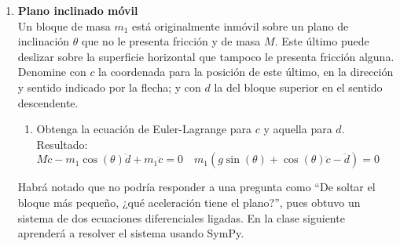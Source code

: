 \documentclass[11pt, a4paper, twoside]{article}
\begin{document}
\begin{enumerate}
\item
	\begin{minipage}[t][4.5cm]{0.7\textwidth}
		\textbf{Plano inclinado móvil}\\
		Un bloque de masa \(m_1\) está originalmente inmóvil sobre un plano de inclinación \(\theta\) que no le presenta fricción y de masa \(M\).
		Este último puede deslizar sobre la superficie horizontal que tampoco le presenta fricción alguna.
		Denomine con \(c\) la coordenada para la posición de este último, en la dirección y sentido indicado por la flecha; y con \(d\) la del bloque superior en el sentido descendente.
		\begin{enumerate}
			\item Obtenga la ecuación de Euler-Lagrange para \(c\) y aquella para \(d\).\\ 
			Resultado:
			\(
				M \ddot{c} - m_1 \cos{\left(\theta \right)} \ddot{d} + m_1 \ddot{c} = 0
				\quad
				m_1 \left(g \sin{\left(\theta \right)} + \cos{\left(\theta \right)} \ddot{c} - \ddot{d }\right) = 0
			\)
		\end{enumerate}
	\end{minipage}
	\begin{minipage}[c][0cm][t]{0.3\textwidth}
		
	\end{minipage}
	Habrá notado que no podría responder a una pregunta como ``De soltar el bloque más pequeño, ¿qué aceleración tiene el plano?'', pues obtuvo un sistema de dos ecuaciones diferenciales ligadas.
	En la clase siguiente aprenderá a resolver el sistema usando SymPy.
	


\end{enumerate}
\end{document}
